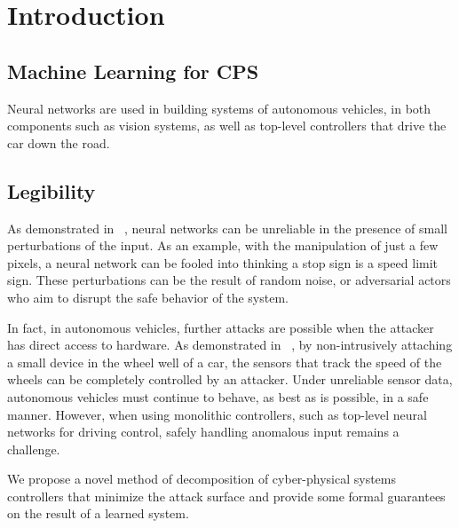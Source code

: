 \section{Introduction}

\subsection{Machine Learning for CPS}

Neural networks are used in building systems of autonomous vehicles, in both components such as vision systems, as well as top-level controllers that drive the car down the road.

\subsection{Legibility}

As demonstrated in ~\cite{NNLegibility}, neural networks can be unreliable in the presence of small perturbations of the input.
As an example, with the manipulation of just a few pixels, a neural network can be fooled into thinking a stop sign is a speed limit sign.
These perturbations can be the result of random noise, or adversarial actors who aim to disrupt the safe behavior of the system.

In fact, in autonomous vehicles, further attacks are possible when the attacker has direct access to hardware.
As demonstrated in ~\cite{brakeHack}, by non-intrusively attaching a small device in the wheel well of a car, the sensors that track the speed of the wheels can be completely controlled by an attacker.
Under unreliable sensor data, autonomous vehicles must continue to behave, as best as is possible, in a safe manner.
However, when using monolithic controllers, such as top-level neural networks for driving control, safely handling anomalous input remains a challenge.

We propose a novel method of decomposition of cyber-physical systems controllers that minimize the attack surface and provide some formal guarantees on the result of a learned system.

